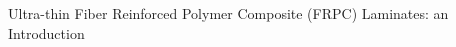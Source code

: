 \documentclass[final]{beamer}
\begin{document}
\begin{frame}
\begin{center}
\begin{minipage}{\textwidth}
\begin{block}{\rule[-0.6ex]{0pt}{50pt}\centering\LARGE Ultra-thin Fiber Reinforced Polymer Composite (FRPC) Laminates: an Introduction}
\begin{columns}
\begin{column}{0.3\textwidth}
    \begin{center}
\begin{figure}[!h]
\centering
     \\
\end{figure}
     \end{center}
\end{column}
\end{columns}

\end{block}
\end{minipage}
\end{center}
\end{frame}
\end{document}
